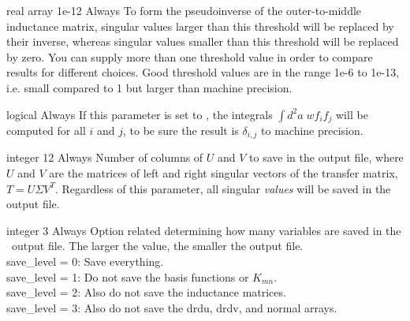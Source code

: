\myhrule

{real array}
{1e-12}
{Always}
{To form the pseudoinverse of the outer-to-middle inductance matrix, singular values larger than this threshold
will be replaced by their inverse, whereas singular values smaller than this threshold will be replaced by zero.
You can supply more than one threshold value in order to compare results for different choices.
Good threshold values are in the range 1e-6 to 1e-13, i.e. small compared to 1 but larger than machine precision.}

\myhrule

{logical}
{\false}
{Always}
{If this parameter is set to \true, the integrals $\int d^2a\; w f_i f_j$ will be computed for all $i$ and $j$,
to be sure the result is $\delta_{i,j}$ to machine precision.}

\myhrule

{integer}
{12}
{Always}
{Number of columns of $U$ and $V$ to save in the output file, where $U$ and $V$ are the matrices of left and right singular vectors of the transfer matrix,
$T = U\Sigma V^{T}$.
Regardless of this parameter, all singular \emph{values} will be saved in the output file.}

\myhrule

{integer}
{3}
{Always}
{Option related determining how many variables are saved in the \netCDF~output file.  The larger the value, the smaller the output file.\\

{\ttfamily save\_level} = 0: Save everything.\\

{\ttfamily save\_level} = 1: Do not save the basis functions or $K_{mn}$.\\

{\ttfamily save\_level} = 2: Also do not save the inductance matrices.\\

{\ttfamily save\_level} = 3: Also do not save the {\ttfamily drdu}, {\ttfamily drdv}, and {\ttfamily normal} arrays.
}

